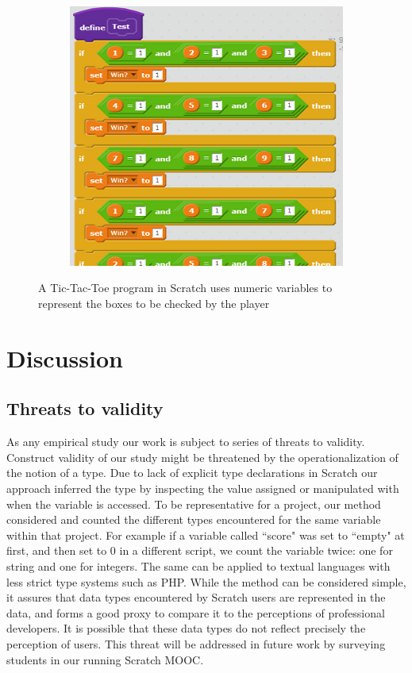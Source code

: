 \documentclass[conference]{IEEEtran}
\begin{document}
\begin{figure}[!h]
\begin{subfigure}{.5\columnwidth}
	\end{subfigure}\hfil%
	\begin{subfigure}{.5\columnwidth}
		\includegraphics[width=\columnwidth]{fig/tic_3}%
	\end{subfigure}%
\caption{A Tic-Tac-Toe program in Scratch uses numeric variables to represent the boxes to be checked by the player}
\label{"fig:tictactoe_example"}
\end{figure}


 \section{Discussion}
\subsection{Threats to validity}

As any empirical study our work is subject to series of threats to validity.
Construct validity of our study might be threatened by the operationalization of the notion of a type. 
Due to lack of explicit type declarations in Scratch our approach inferred the type by inspecting the value assigned or manipulated with when the variable is accessed. To be representative for a project, our method considered and counted the different types encountered for the same variable within that project. For example if a variable called ``score" was set to ``empty" at first, and then set to 0 in a different script, we count the variable twice: one for string and one for integers. The same can be applied to textual languages with less strict type systems such as PHP. While the method can be considered simple, it assures that data types encountered by Scratch users are represented in the data, and forms a good proxy to compare it to the perceptions of professional developers. It is possible that these data types do not reflect precisely the perception of users. This threat will be addressed in future work by surveying students in our running Scratch MOOC. 
\end{document}
